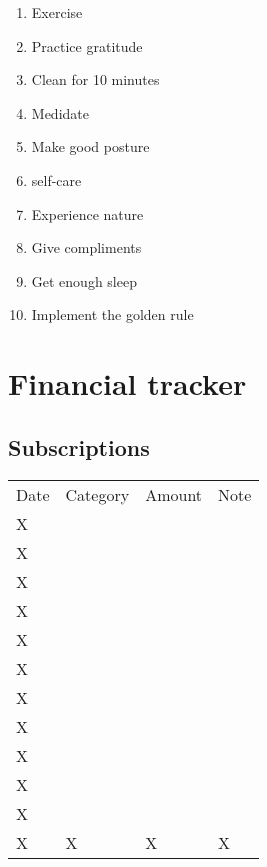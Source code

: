 \documentclass[10pt,a4paper]{article}
\begin{document}
\begin{enumerate}
	\item Exercise
  \item Practice gratitude
  \item Clean for 10 minutes
  \item Medidate
  \item Make good posture 
  \item self-care
  \item Experience nature 
  \item Give compliments
  \item Get enough sleep
  \item Implement the golden rule
\end{enumerate}
\newpage
\section{Financial tracker}
\subsection{Subscriptions}
\begin{table}[htp]
\begin{tabular}{llll}
Date & Category & Amount & Note \\
X    &          &        &      \\
X    &          &        &      \\
X    &          &        &      \\
X    &          &        &      \\
X    &          &        &      \\
X    &          &        &      \\
X    &          &        &      \\
X    &          &        &      \\
X    &          &        &      \\
X    &          &        &      \\
X    &          &        &      \\
X    &X         &X       &X    
\end{tabular}
\end{table}
\end{document}
